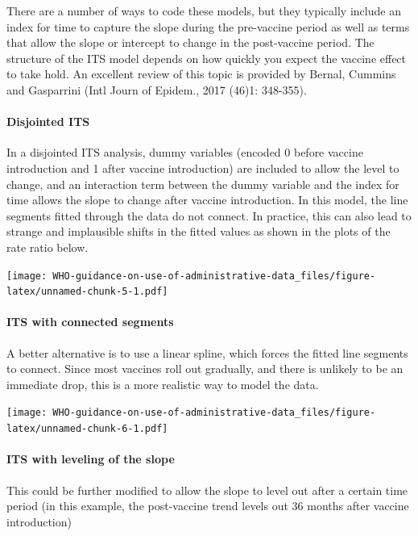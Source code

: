 \documentclass[]{article}
\let\oldparagraph\paragraph
\renewcommand{\paragraph}[1]{\oldparagraph{#1}\mbox{}}
\begin{document}
There are a number of ways to code these models, but they typically
include an index for time to capture the slope during the pre-vaccine
period as well as terms that allow the slope or intercept to change in
the post-vaccine period. The structure of the ITS model depends on how
quickly you expect the vaccine effect to take hold. An excellent review
of this topic is provided by Bernal, Cummins and Gasparrini (Intl Journ
of Epidem., 2017 (46)1: 348-355).

\paragraph{Disjointed ITS}\label{disjointed-its}

In a disjointed ITS analysis, dummy variables (encoded 0 before vaccine
introduction and 1 after vaccine introduction) are included to allow the
level to change, and an interaction term between the dummy variable and
the index for time allows the slope to change after vaccine
introduction. In this model, the line segments fitted through the data
do not connect. In practice, this can also lead to strange and
implausible shifts in the fitted values as shown in the plots of the
rate ratio below.

\texttt{[image: WHO-guidance-on-use-of-administrative-data\_files/figure-latex/unnamed-chunk-5-1.pdf]}

\paragraph{ITS with connected
segments}\label{its-with-connected-segments}

A better alternative is to use a linear spline, which forces the fitted
line segments to connect. Since most vaccines roll out gradually, and
there is unlikely to be an immediate drop, this is a more realistic way
to model the data.

\texttt{[image: WHO-guidance-on-use-of-administrative-data\_files/figure-latex/unnamed-chunk-6-1.pdf]}

\paragraph{ITS with leveling of the
slope}\label{its-with-leveling-of-the-slope}

This could be further modified to allow the slope to level out after a
certain time period (in this example, the post-vaccine trend levels out
36 months after vaccine introduction)
\end{document}

